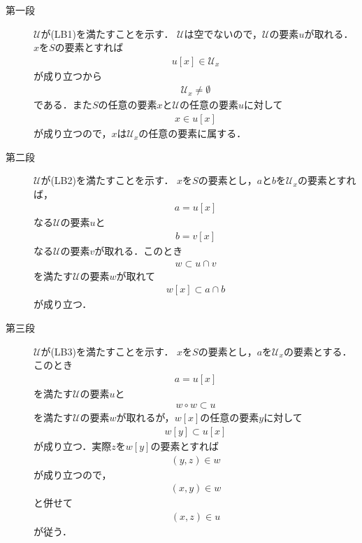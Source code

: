 	\begin{prf}\mbox{}
		\begin{description}
			\item[第一段]
				$\mathcal{U}$が(LB1)を満たすことを示す．
				$\mathscr{U}$は空でないので，$\mathscr{U}$の要素$u$が取れる．$x$を$S$の要素とすれば
				\begin{align}
					u[x] \in \mathcal{U}_{x}
				\end{align}
				が成り立つから
				\begin{align}
					\mathcal{U}_{x} \neq \emptyset
				\end{align}
				である．また$S$の任意の要素$x$と$\mathscr{U}$の任意の要素$u$に対して
				\begin{align}
					x \in u[x]
				\end{align}
				が成り立つので，$x$は$\mathcal{U}_{x}$の任意の要素に属する．
				
			\item[第二段]
				$\mathcal{U}$が(LB2)を満たすことを示す．
				$x$を$S$の要素とし，$a$と$b$を$\mathcal{U}_{x}$の要素とすれば，
				\begin{align}
					a = u[x]
				\end{align}
				なる$\mathscr{U}$の要素$u$と
				\begin{align}
					b = v[x]
				\end{align}
				なる$\mathscr{U}$の要素$v$が取れる．このとき
				\begin{align}
					w \subset u \cap v
				\end{align}
				を満たす$\mathscr{U}$の要素$w$が取れて
				\begin{align}
					w[x] \subset a \cap b
				\end{align}
				が成り立つ．
				
			\item[第三段]
				$\mathcal{U}$が(LB3)を満たすことを示す．
				$x$を$S$の要素とし，$a$を$\mathcal{U}_{x}$の要素とする．このとき
				\begin{align}
					a = u[x]
				\end{align}
				を満たす$\mathscr{U}$の要素$u$と
				\begin{align}
					w \circ w \subset u
				\end{align}
				を満たす$\mathscr{U}$の要素$w$が取れるが，$w[x]$の任意の要素$y$に対して
				\begin{align}
					w[y] \subset u[x]
				\end{align}
				が成り立つ．実際$z$を$w[y]$の要素とすれば
				\begin{align}
					(y,z) \in w
				\end{align}
				が成り立つので，
				\begin{align}
					(x,y) \in w
				\end{align}
				と併せて
				\begin{align}
					(x,z) \in u
				\end{align}
				が従う．
				\QED
		\end{description}
	\end{prf}
	

